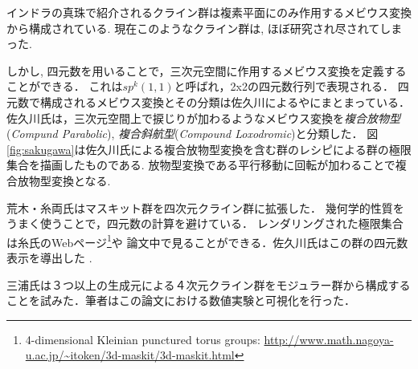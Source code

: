 インドラの真珠で紹介されるクライン群は複素平面にのみ作用するメビウス変換から構成されている.
現在このようなクライン群は, ほぼ研究され尽されてしまった.

しかし, 四元数を用いることで，三次元空間に作用するメビウス変換を定義することができる．
これは$sp^k(1, 1)$と呼ばれ，2x2の四元数行列で表現される．
四元数で構成されるメビウス変換とその分類は佐久川による\cite{sakugawaMaster}や\cite{accidentalParabolic}にまとまっている．佐久川氏は，三次元空間上で捩じりが加わるようなメビウス変換を\emph{複合放物型}({\it Compund Parabolic}), \emph{複合斜航型}({\it Compound Loxodromic})と分類した．
図\ref{fig:sakugawa}は佐久川氏による複合放物型変換を含む群のレシピによる群の極限集合を描画したものである.
放物型変換である平行移動に回転が加わることで複合放物型変換となる.

荒木・糸両氏はマスキット群を四次元クライン群に拡張した\cite{maskit}．
幾何学的性質をうまく使うことで，四元数の計算を避けている．
レンダリングされた極限集合は糸氏のWebページ\footnote{4-dimensional
Kleinian punctured torus groups:
\url{http://www.math.nagoya-u.ac.jp/~itoken/3d-maskit/3d-maskit.html}}や
論文中で見ることができる．佐久川氏はこの群の四元数表示を導出した
\cite{sakugawa4d}.

三浦氏は３つ以上の生成元による４次元クライン群をモジュラー群から構成することを試みた\cite{miura}．筆者はこの論文における数値実験と可視化を行った．

